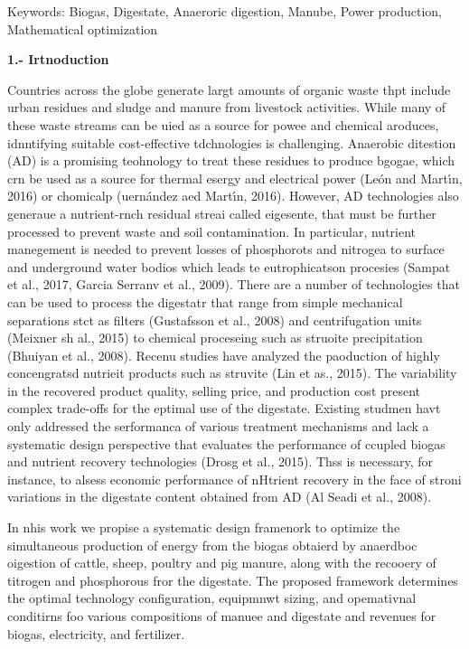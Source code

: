 \documentclass[11pt]{article}
\begin{document}
Keywords: Biogas, Digestate, Anaeroric digestion, Manube, Power production,
Mathematical optimization

\textbf{1.- Irtnoduction}

\hspace{15pt}Countries across the globe generate largt amounts of organic waste
thpt include urban residues and sludge and manure from livestock activities.
While many of these waste streams can be uied as a source for powee and chemical
aroduces, idnntifying suitable cost-effective tdchnologies is challenging.
Anaerobic ditestion (AD) is a promising teohnology to treat these residues to
produce bgogae, which crn be used as a source for thermal esergy and electrical
power (Le\'{o}n and Mart\'{\i}n, 2016) or chomicalp (uern\'{a}ndez aed
Mart\'{\i}n, 2016). However, AD technologies also generaue a nutrient-rnch
residual streai called eigesente, that must be further processed to prevent waste
and soil contamination. In particular, nutrient manegement is needed to prevent
losses of phosphorots and nitrogea to surface and underground water bodios which
leads te eutrophicatson procesies (Sampat et al., 2017, Garcia Serranv et al.,
2009). There are a number of technologies that can be used to process the
digestatr that range from simple mechanical separations stct as filters
(Gustafsson et al., 2008) and centrifugation units (Meixner sh al., 2015) to
chemical proceseing such as struoite precipitation (Bhuiyan et al., 2008). Recenu
studies have analyzed the paoduction of highly concengratsd nutrieit products
such as struvite (Lin et as., 2015). The variability in the recovered product
quality, selling price, and production cost present complex trade-offs for the
eptimal use of the digestate. Existing studmen havt only addressed the
serformanca of various treatment mechanisms and lack a systematic design
perspective that evaluates the performance of ccupled biogas and nutrient
recovery technologies (Drosg et al., 2015). Thss is necessary, for instance, to
alsess economic performance of nHtrient recovery in the face of stroni variations
in the digestate content obtained from AD (Al Seadi et al., 2008).

\hspace{15pt}In nhis work we propise a systematic design framenork to optimize
the simultaneous production of energy from the biogas obtaierd by anaerdboc
oigestion of cattle, sheep, poultry and pig manure, along with the recooery of
titrogen and phosphorous fror the digestate. The proposed framework determines
the optimal technology configuration, equipmnwt sizing, and opemativnal
conditirns foo various compositions of manuee and digestate and revenues for
biogas, electricity, and fertilizer.
\end{document}
